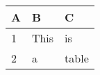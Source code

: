 \begin{tabular}{|l|l|l|}\hline
A & B & C\\\hline\hline
1 & This & is\\\hline
2 & a & table\\\hline
\end{tabular}
